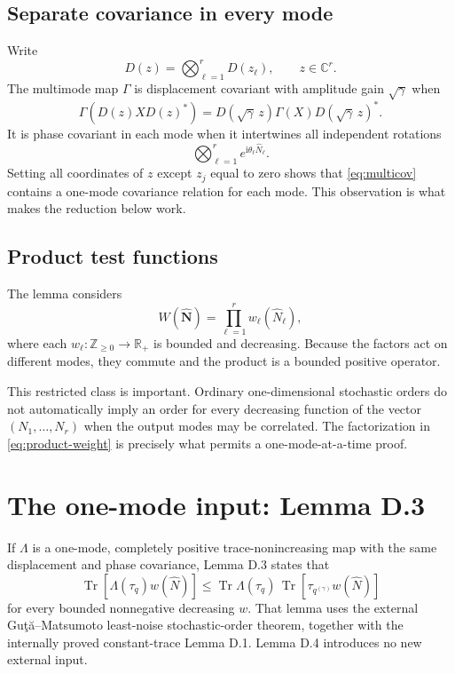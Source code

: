 \documentclass[11pt]{article}
\newcommand{\Tr}{\operatorname{Tr}}
\newcommand{\R}{\mathbb R}
\begin{document}
\subsection{Separate covariance in every mode}

Write
\[
  D(z)=\bigotimes_{\ell=1}^r D(z_\ell),
  \qquad z\in\mathbb C^r.
\]
The multimode map $\Gamma$ is displacement covariant with amplitude gain
$\sqrt\gamma$ when
\begin{equation}\label{eq:multicov}
  \Gamma(D(z)XD(z)^*)
  =D(\sqrt\gamma\,z)\Gamma(X)D(\sqrt\gamma\,z)^*.
\end{equation}
It is phase covariant in each mode when it intertwines all independent
rotations
\[
  \bigotimes_{\ell=1}^r e^{\mathrm i\theta_\ell\widehat N_\ell}.
\]
Setting all coordinates of $z$ except $z_j$ equal to zero shows that
\eqref{eq:multicov} contains a one-mode covariance relation for each mode.
This observation is what makes the reduction below work.

\subsection{Product test functions}

The lemma considers
\begin{equation}\label{eq:product-weight}
  W(\widehat{\mathbf N})
  =\prod_{\ell=1}^r w_\ell(\widehat N_\ell),
\end{equation}
where each $w_\ell:\mathbb Z_{\geq0}\to\R_+$ is bounded and decreasing.
Because the factors act on different modes, they commute and the product is
a bounded positive operator.

This restricted class is important.  Ordinary one-dimensional stochastic
orders do not automatically imply an order for every decreasing function of
the vector $(N_1,\ldots,N_r)$ when the output modes may be correlated.  The
factorization in \eqref{eq:product-weight} is precisely what permits a
one-mode-at-a-time proof.

\section{The one-mode input: Lemma D.3}

If $\Lambda$ is a one-mode, completely positive trace-nonincreasing map with
the same displacement and phase covariance, Lemma D.3 states that
\begin{equation}\label{eq:D3}
  \Tr[\Lambda(\tau_q)w(\widehat N)]
  \leq
  \Tr\Lambda(\tau_q)\,
  \Tr[\tau_{q^{(\gamma)}}w(\widehat N)]
\end{equation}
for every bounded nonnegative decreasing $w$.  That lemma uses the external
Gu\c{t}\u{a}--Matsumoto least-noise stochastic-order theorem, together with
the internally proved constant-trace Lemma D.1.  Lemma D.4 introduces no new
external input.
\end{document}
